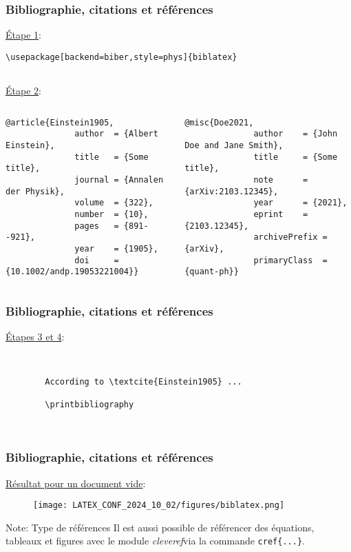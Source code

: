 \begin{frame}[fragile]
    \frametitle{Bibliographie, citations et références}
    \underline{Étape 1}:
    \vfill
    \begin{lstlisting}[xleftmargin=-1.5cm, basicstyle=\small]
        \usepackage[backend=biber,style=phys]{biblatex}
        
    \end{lstlisting}
    \vfill
    \pause
    \underline{Étape 2}:
    \begin{columns}
        \begin{lstlisting}[xleftmargin=-1cm, basicstyle=\footnotesize]
            @article{Einstein1905,
              author  = {Albert Einstein}, 
              title   = {Some title},
              journal = {Annalen der Physik},
              volume  = {322},
              number  = {10},
              pages   = {891--921},
              year    = {1905},
              doi     = {10.1002/andp.19053221004}}
        \end{lstlisting}
        \begin{lstlisting}[xleftmargin=-1cm, basicstyle=\footnotesize]
            @misc{Doe2021,
              author    = {John Doe and Jane Smith},
              title     = {Some title},
              note      = {arXiv:2103.12345},
              year      = {2021},
              eprint    = {2103.12345},
              archivePrefix = {arXiv},
              primaryClass  = {quant-ph}}
        \end{lstlisting}
    \end{columns}
\end{frame}

\begin{frame}[fragile]
    \frametitle{Bibliographie, citations et références}
    \underline{Étapes 3 et 4}:
    \vfill
    \begin{lstlisting}[xleftmargin=-1cm, basicstyle=\small]
       

        According to \textcite{Einstein1905} ...

        \printbibliography
        
        
    \end{lstlisting}
\end{frame}

\begin{frame}[fragile]
    \frametitle{Bibliographie, citations et références}
    \underline{Résultat pour un document vide}:
    \vfill
    \begin{figure}
        \centering
        \texttt{[image: LATEX\_CONF\_2024\_10\_02/figures/biblatex.png]}
        \label{fig: biblatex}
    \end{figure}
    \vfill\pause
    \begin{noteblock}{Note: Type de références}
        Il est aussi possible de référencer des équations, tableaux et figures avec le module \textcolor{vibrant_green}{\textit{cleveref}}\footnotemark via la commande \texttt{cref\{...\}}.
    \end{noteblock}
\end{frame}